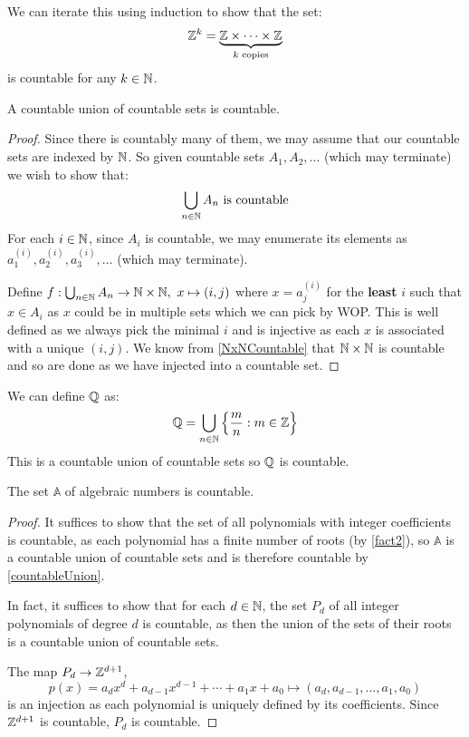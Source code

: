 \documentclass[../main.tex]{subfiles}
\begin{document}
\begin{remark}
  We can iterate this using induction to show that the set:
  \[
    \mathbb{Z}^{k} = \underbrace{\mathbb{Z} \times \cdots \times \mathbb{Z}}_{k \text{ copies}}
  \]
  is countable for any $k \in \mathbb{N}$.
\end{remark}
\begin{theorem}
  A countable union of countable sets is countable. \label{countableUnion}
\end{theorem}
\begin{proof}
  Since there is countably many of them, we may assume that our countable sets are indexed by $\mathbb{N}$.
  So given countable sets $A_1, A_2, \ldots$ (which may terminate) we wish to show that:
  \[
    \bigcup_{n \in \mathbb{N}} A_n \text{ is countable}
  \]
  For each $i \in \mathbb{N}$, since $A_i$ is countable, we may enumerate its elements as $a^{(i)}_{1}, a^{(i)}_{2}, a^{(i)}_{3}, \ldots$ (which may terminate).

  Define $f: \bigcup_{n \in \mathbb{N}} A_n \to \mathbb{N} \times \mathbb{N},\ x \mapsto (i, j)$ where $x = a^{(i)}_{j}$ for the \textbf{least} $i$ such that $x \in A_i$ as $x$ could be in multiple sets which we can pick by WOP.
  This is well defined as we always pick the minimal $i$ and is injective as each $x$ is associated with a unique $(i, j)$.
  We know from \cref{NxNCountable} that $\mathbb{N} \times \mathbb{N}$ is countable and so are done as we have injected into a countable set.
\end{proof}
\begin{example}[Countability of $\Q$]
  We can define $\Q$ as:
  \[
    \mathbb{Q} = \bigcup_{n \in \mathbb{N}} \left\{\frac{m}{n}: m \in \mathbb{Z}\right\}
  \]
  This is a countable union of countable sets so $\Q$ is countable.
\end{example}
\begin{theorem}
  The set $\mathbb{A}$ of algebraic numbers is countable. \label{ACountable}
\end{theorem}
\begin{proof}
  It suffices to show that the set of all polynomials with integer coefficients is countable, as each polynomial has a finite number of roots (by \cref{fact2}), so $\mathbb{A}$ is a countable union of countable sets and is therefore countable by \cref{countableUnion}.

  In fact, it suffices to show that for each $d \in \mathbb{N}$, the set $P_d$ of all integer polynomials of degree $d$ is countable, as then the union of the sets of their roots is a countable union of countable sets.

  The map $P_d \to \mathbb{Z}^{d + 1}$,
  \[
    p(x) = a_d x^{d} + a_{d - 1}x^{d - 1} + \cdots + a_1 x + a_0 \mapsto (a_d, a_{d - 1}, \ldots, a_1, a_0)
  \]
  is an injection as each polynomial is uniquely defined by its coefficients.
  Since $\mathbb{Z}^{d + 1}$ is countable, $P_d$ is countable.
\end{proof}
\end{document}

